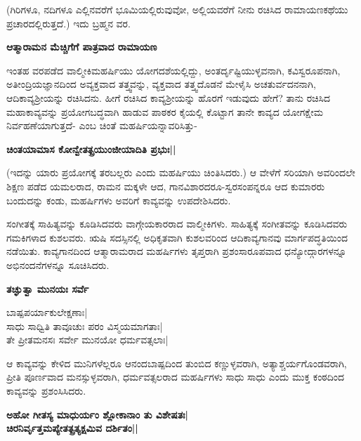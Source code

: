 (ಗಿರಿಗಳೂ, ನದಿಗಳೂ ಎಲ್ಲಿನವರೆಗೆ ಭೂಮಿಯಲ್ಲಿರುವುವೋ, ಅಲ್ಲಿಯವರೆಗೆ ನೀನು ರಚಿಸಿದ ರಾಮಾಯಣಕಥೆಯು ಪ್ರಚಾರದಲ್ಲಿರುತ್ತದೆ.) ಇದು ಬ್ರಹ್ಮನ ವರ. 


{\bf ಆತ್ಮಾರಾಮನ ಮೆಚ್ಚಿಗೆಗೆ ಪಾತ್ರವಾದ ರಾಮಾಯಣ} 


ಇಂತಹ ವರಪಡೆದ ವಾಲ್ಮೀಕಿಮಹರ್ಷಿಯು ಯೋಗದಶೆಯಲ್ಲಿದ್ದು, ಅಂತರ್ದೃಷ್ಟಿಯುಳ್ಳವನಾಗಿ, ಕವಿಸ್ವರೂಪನಾಗಿ, ಅತೀಂದ್ರಿಯಜ್ಞಾನದಿಂದ ಅವ್ಯಕ್ತವಾದ ತತ್ತ್ವವನ್ನು, ವ್ಯಕ್ತವಾದ ತತ್ತ್ವದೊಡನೆ ಮೇಳೈಸಿ ಅಚತುರ್ವದನನಾಗಿ, ಆದಿಕಾವ್ಯಶ್ರೀಯನ್ನು ರಚಿಸಿದನು. ಹೀಗೆ ರಚಿಸಿದ ಕಾವ್ಯಶ್ರೀಯನ್ನು ಹೊರಗೆ ಇಡುವುದು ಹೇಗೆ? ತಾನು ರಚಿಸಿದ ಮಹಾಕಾವ್ಯವನ್ನು ಪ್ರಯೋಗಬದ್ಧವಾಗಿ ಹಾಡುವ ಪಾಠಕರ ಕೈಯಲ್ಲಿ ಕೊಟ್ಟಾಗ ತಾನೇ ಕಾವ್ಯದ ಯೋಗಕ್ಷೇಮ ನಿರ್ವಹಣೆಯಾಗುತ್ತದೆ- ಎಂಬ ಚಿಂತೆ ಮಹರ್ಷಿಯನ್ನಾವರಿಸಿತ್ತು- 


\begin{center} 

{\bf ಚಿಂತಯಾಮಾಸ ಕೋನ್ವೇತತ್ಪ್ರಯುಂಜೀಯಾದಿತಿ ಪ್ರಭುಃ||} 

\end{center} 


(ಇದನ್ನು ಯಾರು ಪ್ರಯೋಗಕ್ಕೆ ತರಬಲ್ಲರು ಎಂದು ಮಹರ್ಷಿಯು ಚಿಂತಿಸಿದರು.) ಆ ವೇಳೆಗೆ ಸರಿಯಾಗಿ ಅವರಿಂದಲೇ ಶಿಕ್ಷಣ ಪಡೆದ ಯಮಲರಾದ, ರಾಮನ ಮಕ್ಕಳೇ ಆದ, ಗಾನವಿಶಾರದರೂ-ಸ್ವರಸಂಪನ್ನರೂ ಆದ ಕುಮಾರರು ಬಂದುದನ್ನು ಕಂಡು, ಮಹರ್ಷಿಗಳು ಅವರಿಗೆ ಕಾವ್ಯವನ್ನು ಉಪದೇಶಿಸಿದರು. 


ಸಂಗೀತಕ್ಕೆ ಸಾಹಿತ್ಯವನ್ನು ಕೂಡಿಸಿದವರು ವಾಗ್ಗೇಯಕಾರರಾದ ವಾಲ್ಮೀಕಿಗಳು. ಸಾಹಿತ್ಯಕ್ಕೆ ಸಂಗೀತವನ್ನು ಕೂಡಿಸಿದವರು ಗಮಕಿಗಳಾದ ಕುಶಲವರು. ಋಷಿ ಸದಸ್ಸಿನಲ್ಲಿ ಅಧಿಕೃತವಾಗಿ ಕುಶಲವರಿಂದ ಆದಿಕಾವ್ಯಗಾನವು ಮಾರ್ಗಪದ್ಧತಿಯಿಂದ ನಡೆಯಿತು. ಕಾವ್ಯಗಾನದಿಂದ ಆತ್ಮಾರಾಮರಾದ ಮಹರ್ಷಿಗಳು ತೃಪ್ತರಾಗಿ ಪ್ರಶಂಸಾರೂಪವಾದ ಧನ್ಯೋದ್ಗಾರಗಳನ್ನೂ ಅಭಿನಂದನೆಗಳನ್ನೂ ಸೂಚಿಸಿದರು. 


\begin{center} 

{\bf ತಚ್ಘುತ್ವಾ ಮುನಯಃ ಸರ್ವೆ

ಬಾಷ್ಪಪರ್ಯಾಕುಲೇಕ್ಷಣಾಃ|\\ 

ಸಾಧು ಸಾಧ್ವಿತಿ ತಾವೂಚುಃ ಪರಂ ವಿಸ್ಮಯಮಾಗತಾಃ|\\ 

ತೇ ಪ್ರೀತಮನಸಃ ಸರ್ವೇ ಮುನಯೋ ಧರ್ಮವತ್ಸಲಾಃ|} 

\end{center} 


ಆ ಕಾವ್ಯವನ್ನು ಕೇಳಿದ ಮುನಿಗಳೆಲ್ಲರೂ ಆನಂದಬಾಷ್ಪದಿಂದ ತುಂಬಿದ ಕಣ್ಣುಳ್ಳವರಾಗಿ, ಅತ್ಯಾಶ್ಚರ್ಯಗೊಂಡವರಾಗಿ, ಪ್ರೀತಿ ಪೂರ್ಣವಾದ ಮನಸ್ಸುಳ್ಳವರಾಗಿ, ಧರ್ಮವತ್ಸಲರಾದ ಮಹರ್ಷಿಗಳು ಸಾಧು ಸಾಧು ಎಂದು ಮುಕ್ತ ಕಂಠದಿಂದ ಕಾವ್ಯವನ್ನು ಪ್ರಶಂಸಿಸಿದರು. 


\begin{center} 

{\bf ಅಹೋ ಗೀತಸ್ಯ ಮಾಧುರ್ಯಂ ಶ್ಲೋಕಾನಾಂ ತು ವಿಶೇಷತಃ|\\ 

ಚಿರನಿರ್ವೃತ್ತಮಪ್ಯೇತತ್ಪ್ರತ್ಯಕ್ಷಮಿವ ದರ್ಶಿತಂ||} 

\end{center} 



